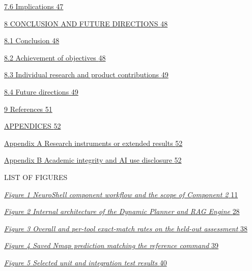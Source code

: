 \documentclass[
]{article}
\begin{document}
\protect\hyperlink{implications}{7.6 Implications
\protect\hyperlink{implications}{47}}

\protect\hyperlink{conclusion-and-future-directions}{8 CONCLUSION AND
FUTURE DIRECTIONS
\protect\hyperlink{conclusion-and-future-directions}{48}}

\protect\hyperlink{conclusion}{8.1 Conclusion
\protect\hyperlink{conclusion}{48}}

\protect\hyperlink{achievement-of-objectives}{8.2 Achievement of
objectives \protect\hyperlink{achievement-of-objectives}{48}}

\protect\hyperlink{individual-research-and-product-contributions}{8.3
Individual research and product contributions
\protect\hyperlink{individual-research-and-product-contributions}{49}}

\protect\hyperlink{future-directions}{8.4 Future directions
\protect\hyperlink{future-directions}{49}}

\protect\hyperlink{_Toc242369075}{9 References
\protect\hyperlink{_Toc242369075}{51}}

\protect\hyperlink{appendices}{APPENDICES
\protect\hyperlink{appendices}{52}}

\protect\hyperlink{appendix-a-research-instruments-or-extended-results}{Appendix
A Research instruments or extended results
\protect\hyperlink{appendix-a-research-instruments-or-extended-results}{52}}

\protect\hyperlink{appendix-b-academic-integrity-and-ai-use-disclosure}{Appendix
B Academic integrity and AI use disclosure
\protect\hyperlink{appendix-b-academic-integrity-and-ai-use-disclosure}{52}}

LIST OF FIGURES

\protect\hyperlink{_Toc242369079}{\emph{Figure 1 NeuroShell component
workflow and the scope of Component 2}
\protect\hyperlink{_Toc242369079}{11}}

\protect\hyperlink{_Toc242369080}{\emph{Figure 2 Internal architecture
of the Dynamic Planner and RAG Engine}
\protect\hyperlink{_Toc242369080}{28}}

\protect\hyperlink{_Toc242369081}{\emph{Figure 3 Overall and per-tool
exact-match rates on the held-out assessment}
\protect\hyperlink{_Toc242369081}{38}}

\protect\hyperlink{_Toc242369082}{\emph{Figure 4 Saved Nmap prediction
matching the reference command} \protect\hyperlink{_Toc242369082}{39}}

\protect\hyperlink{_Toc242369083}{\emph{Figure 5 Selected unit and
integration test results} \protect\hyperlink{_Toc242369083}{40}}
\end{document}
